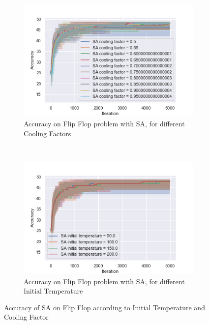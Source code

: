\documentclass[twocolumn, 10pt]{article}
\begin{document}
				\begin{figure}[h]
					\begin{subfigure}[t]{0.45\columnwidth}
						\centering
						\includegraphics[width=\linewidth]{../graphics/flip_flop_SA_Iteration_Error_SA_cooling_factor.png}
						\caption{Accuracy on Flip Flop problem with SA, for different Cooling Factors}
						\label{ff:sa_cooling}
					\end{subfigure}
					~
					\begin{subfigure}[t]{0.45\columnwidth}
						\centering
						\includegraphics[width=\linewidth]{../graphics/flip_flop_SA_Iteration_Error_SA_initial_temperature.png}
						\caption{Accuracy on Flip Flop problem with SA, for different Initial Temperature}
						\label{ff:sa_initial_temp}
					\end{subfigure}
					\caption{Accuracy of SA on Flip Flop according to Initial Temperature and Cooling Factor}
					\label{ff:sa}
				\end{figure}
\end{document}
